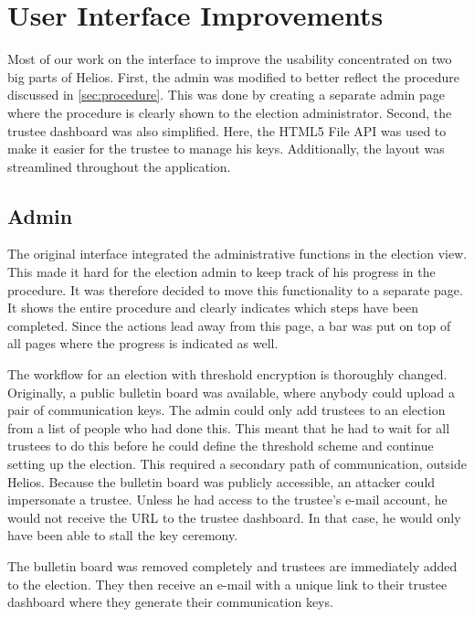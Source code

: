 % 
%

\section{User Interface Improvements}
\label{sec:user_interface_improvements}

Most of our work on the interface to improve the usability concentrated on two big parts of Helios. First, the admin was modified to better reflect the procedure discussed in \ref{sec:procedure}. This was done by creating a separate admin page where the procedure is clearly shown to the election administrator. Second, the trustee dashboard was also simplified. Here, the HTML5 File API was used to make it easier for the trustee to manage his keys. Additionally, the layout was streamlined throughout the application. 

\subsection{Admin}

The original interface integrated the administrative functions in the election view. This made it hard for the election admin to keep track of his progress in the procedure. It was therefore decided to move this functionality to a separate page. It shows the entire procedure and clearly indicates which steps have been completed. Since the actions lead away from this page, a bar was put on top of all pages where the progress is indicated as well.

\par The workflow for an election with threshold encryption is thoroughly changed. Originally, a public bulletin board was available, where anybody could upload a pair of communication keys. The admin could only add trustees to an election from a list of people who had done this. This meant that he had to wait for all trustees to do this before he could define the threshold scheme and continue setting up the election. This required a secondary path of communication, outside Helios. Because the bulletin board was publicly accessible, an attacker could impersonate a trustee. Unless he had access to the trustee's e-mail account, he would not receive the URL to the trustee dashboard. In that case, he would only have been able to stall the key ceremony.

\par The bulletin board was removed completely and trustees are immediately added to the election. They then receive an e-mail with a unique link to their trustee dashboard where they generate their communication keys.

